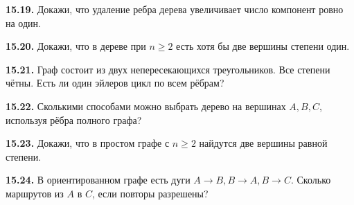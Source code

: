 \noindent\begin{minipage}[t]{\linewidth}\textbf{15.19.}\starmark{} Докажи, что удаление ребра дерева увеличивает число компонент ровно на один.\par\end{minipage}\par
\noindent\begin{minipage}[t]{\linewidth}\textbf{15.20.}\starmark{} Докажи, что в дереве при \(n\ge2\) есть хотя бы две вершины степени один.\par\end{minipage}\par
\noindent\begin{minipage}[t]{\linewidth}\textbf{15.21.}\starmark{} Граф состоит из двух непересекающихся треугольников. Все степени чётны. Есть ли один эйлеров цикл по всем рёбрам?\par\end{minipage}\par
\noindent\begin{minipage}[t]{\linewidth}\textbf{15.22.} Сколькими способами можно выбрать дерево на вершинах \(A,B,C\), используя рёбра полного графа?\par\end{minipage}\par
\noindent\begin{minipage}[t]{\linewidth}\textbf{15.23.}\starmark{} Докажи, что в простом графе с \(n\ge2\) найдутся две вершины равной степени.\par\end{minipage}\par
\noindent\begin{minipage}[t]{\linewidth}\textbf{15.24.}\starmark{} В ориентированном графе есть дуги \(A\to B,B\to A,B\to C\). Сколько маршрутов из \(A\) в \(C\), если повторы разрешены?\par\end{minipage}\par
\endgroup
